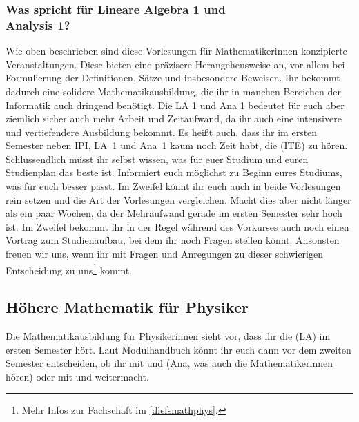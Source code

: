 \vspace{-2mm}
\subsubsection{Was spricht für Lineare Algebra 1 und\\Analysis 1?}
Wie oben beschrieben sind diese Vorlesungen für Mathematikerinnen konzipierte Veranstaltungen. Diese bieten eine präzisere Herangehensweise an, vor allem bei Formulierung der Definitionen, Sätze und insbesondere Beweisen. Ihr bekommt dadurch eine solidere Mathematikausbildung, die ihr in manchen Bereichen der Informatik auch dringend benötigt. Die \gls{LA} 1 und \gls{Ana} 1 bedeutet für euch aber ziemlich sicher auch mehr Arbeit und Zeitaufwand, da ihr auch eine intensivere und vertiefendere Ausbildung bekommt. Es heißt auch, dass ihr im ersten Semester neben \gls{IPI}, \gls{LA}~1 und \gls{Ana}~1 kaum noch Zeit habt, die  (\gls{ITE}) zu hören.\\

Schlussendlich müsst ihr selbst wissen, was für euer Studium und euren Studienplan das beste ist. Informiert euch möglichst zu Beginn eures Studiums, was für euch besser passt. Im Zweifel könnt ihr euch auch in beide Vorlesungen rein setzen und die Art der Vorlesungen vergleichen. Macht dies aber nicht länger als ein paar Wochen, da der Mehraufwand gerade im ersten Semester sehr hoch ist. Im Zweifel bekommt ihr in der Regel während des Vorkurses auch noch einen Vortrag zum Studienaufbau, bei dem ihr noch Fragen stellen könnt. Ansonsten freuen wir uns, wenn ihr mit Fragen und Anregungen zu dieser schwierigen Entscheidung zu uns\footnote{Mehr Infos zur Fachschaft im \autoref{diefsmathphys}.} kommt.

\vspace{-3mm}
\subsection{Höhere Mathematik für Physiker}
\vspace{-1mm}
\label{mathephysik}
Die Mathematikausbildung für Physikerinnen sieht vor, dass ihr die  (\gls{LA}) im ersten Semester hört. Laut Modulhandbuch könnt ihr euch dann vor dem zweiten Semester entscheiden, ob ihr mit  und  (\gls{Ana}, was auch die Mathematikerinnen hören) oder mit  und  weitermacht.

\vspace{-2mm}
